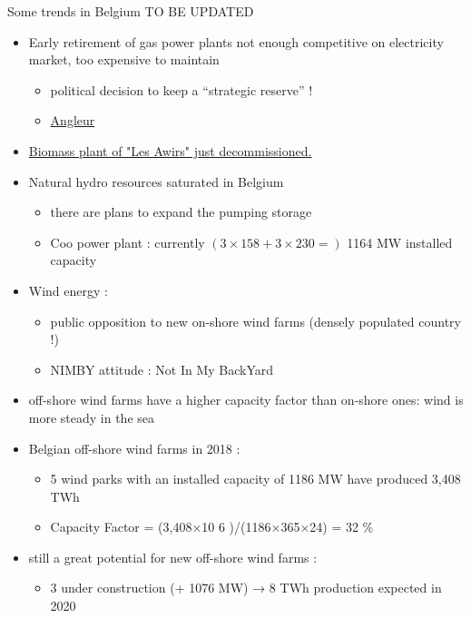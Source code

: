 \begin{frame}[allowframebreaks]{Some trends in Belgium TO BE UPDATED} 
\begin{itemize}
\item Early retirement of gas power plants not enough competitive on electricity market, too expensive to maintain
\begin{itemize}
\item political decision to keep a “strategic reserve” !
\item \href{https://edfluminus.edf.com/edf/la-centrale-electrique-d-angleur}{Angleur}
\end{itemize}
\item \href{https://www.rtbf.be/info/regions/liege/detail_flemalle-fermeture-de-la-plus-grande-centrale-biomasse-de-wallonie-aux-awirs?id=10555470}{Biomass plant of "Les Awirs" just decommissioned.}
\item Natural hydro resources saturated in Belgium
\begin{itemize}
\item there are plans to expand the pumping storage
\item Coo power plant : currently $(3 \times 158 + 3 \times 230 =) $ 1164 MW installed capacity
\end{itemize}
\item Wind energy :
\begin{itemize}
\item public opposition to new on-shore wind farms (densely populated country !)
\item NIMBY attitude : Not In My BackYard
\end{itemize}
\end{itemize}
\begin{itemize}
\item off-shore wind farms have a higher capacity factor than on-shore ones: wind is more steady in the sea
\item Belgian off-shore wind farms in 2018 :
\begin{itemize}
\item 5 wind parks with an installed capacity of 1186 MW have produced 3,408 TWh
\item Capacity Factor = (3,408×10 
6
 )/(1186×365×24) = 32 \%
\end{itemize}
\item still a great potential for new off-shore wind farms :
\begin{itemize}
\item 3 under construction (+ 1076 MW) → 8 TWh production expected in 2020
\end{itemize}
\end{itemize}
\end{frame}


